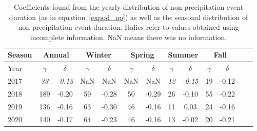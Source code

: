 \begin{table}[htb]
  \begin{center}
    \begin{tabular}{|l|*{11}{c|}r|}
      \hline
      Season    &       \multicolumn{2}{|c|}{Annual}          & \multicolumn{2}{|c|}{Winter}& \multicolumn{2}{|c|}{Spring}  & \multicolumn{2}{|c|}{Summer} &\multicolumn{2}{|c|}{Fall}  \\
      \hline
      Year      & $\gamma $ & $\delta$  & $\gamma $ & $\delta$ & $\gamma $ & $\delta$ & $\gamma $ & $\delta$ & $\gamma $ & $\delta$\\
      \hline
      2017      & \textit{33}  & \textit{-0.13}  & NaN & NaN & NaN & NaN & \textit{12}  & \textit{-0.15}  & 19  & -0.12  \\
      2018      & 189           & -0.20  & 59 & -0.28 & 50 & -0.29 & 26  & -0.10  & 55 & -0.22  \\
      2019      & 136           & -0.16  & 63 & -0.30 & 46 & -0.16 & 11 & 0.03 & 24 & -0.16   \\
      2020      & 140           & -0.17  & 64 & -0.23 & 46 & -0.16 & 13  & -0.02  & 20 & -0.21 \\
      \hline
    \end{tabular}
  \end{center}
  \caption[Year comparison of coefficients for non-precipitation
    events] {\label{thirdtable}Coefficients found from the yearly
    distribution of non-precipitation event duration (as in
    equation~\ref{expod_np}) as well as the seasonal distribution of
    non-precipitation event duration. Italics refer to values obtained
    using incomplete information. NaN means there was no
    information. }
\end{table}
